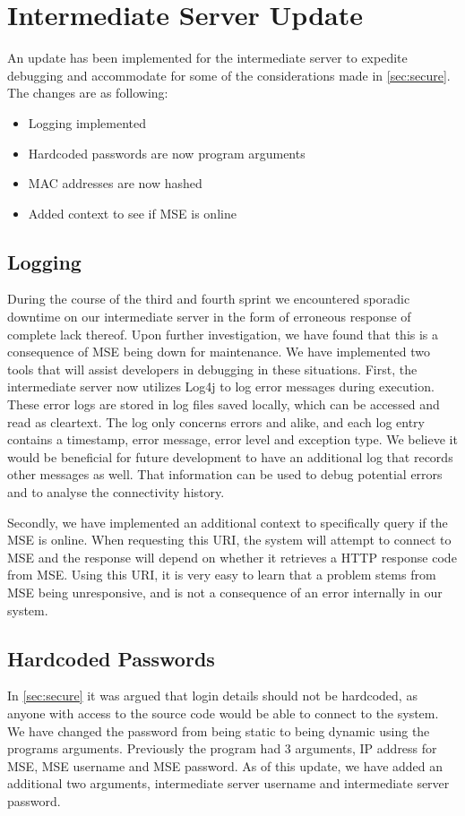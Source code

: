 \section{Intermediate Server Update}
An update has been implemented for the intermediate server to expedite debugging and accommodate for some of the considerations made in \cref{sec:secure}. The changes are as following:
\begin{itemize}
\item Logging implemented
\item Hardcoded passwords are now program arguments
\item MAC addresses are now hashed
\item Added context to see if MSE is online
\end{itemize}

\subsection*{Logging}
During the course of the third and fourth sprint we encountered sporadic downtime on our intermediate server in the form of erroneous response of complete lack thereof. Upon further investigation, we have found that this is a consequence of MSE being down for maintenance. We have implemented two tools that will assist developers in debugging in these situations.
First, the intermediate server now utilizes Log4j \cite{log4j} to log error messages during execution. These error logs are stored in log files saved locally, which can be accessed and read as cleartext. The log only concerns errors and alike, and each log entry contains a timestamp, error message, error level and exception type. We believe it would be beneficial for future development to have an additional log that records other messages as well. That information can be used to debug potential errors and to analyse the connectivity history.

Secondly, we have implemented an additional context to specifically query if the MSE is online. When requesting this URI, the system will attempt to connect to MSE and the response will depend on whether it retrieves a HTTP response code from MSE. Using this URI, it is very easy to learn that a problem stems from MSE being unresponsive, and is not a consequence of an error internally in our system.

\subsection*{Hardcoded Passwords}
In \cref{sec:secure} it was argued that login details should not be hardcoded, as anyone with access to the source code would be able to connect to the system. We have changed the password from being static to being dynamic using the programs arguments. Previously the program had 3 arguments, IP address for MSE, MSE username and MSE password. As of this update, we have added an additional two arguments, intermediate server username and intermediate server password.

